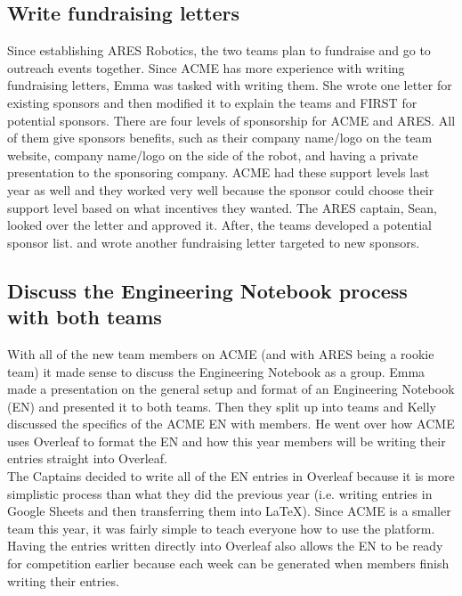 \documentclass{article}
\begin{document}
\subsection{Write fundraising letters}
Since establishing ARES Robotics, the two teams plan to fundraise and go to outreach events together. Since ACME has more experience with writing fundraising letters, Emma was tasked with writing them. She wrote one letter for existing sponsors and then modified it to explain the teams and FIRST for potential sponsors. There are four levels of sponsorship for ACME and ARES. All of them give sponsors benefits, such as their company name/logo on the team website, company name/logo on the side of the robot, and having a private presentation to the sponsoring company. ACME had these support levels last year as well and they worked very well because the sponsor could choose their support level based on what incentives they wanted. The ARES captain, Sean, looked over the letter and approved it. After, the teams developed a potential sponsor list. and wrote another fundraising letter targeted to new sponsors.  

\subsection{Discuss the Engineering Notebook process with both teams}
With all of the new team members on ACME (and with ARES being a rookie team) it made sense to discuss the Engineering Notebook as a group. Emma made a presentation on the general setup and format of an Engineering Notebook (EN) and presented it to both teams. Then they split up into teams and Kelly discussed the specifics of the ACME EN with members. He went over how ACME uses Overleaf to format the EN and how this year members will be writing their entries straight into Overleaf. \\

The Captains decided to write all of the EN entries in Overleaf because it is more simplistic process than what they did the previous year (i.e. writing entries in Google Sheets and then transferring them into \LaTeX). Since ACME is a smaller team this year, it was fairly simple to teach everyone how to use the platform. Having the entries written directly into Overleaf also allows the EN to be ready for competition earlier because each week can be generated when members finish writing their entries. 
\end{document}
